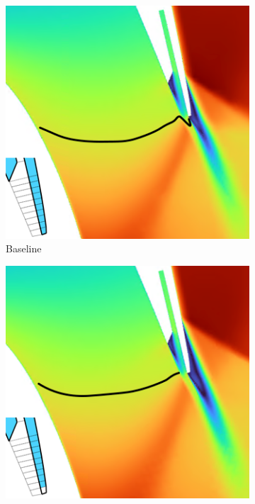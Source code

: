 \documentclass[a4paper, 11pt, oneside]{report}
\begin{document}
\begin{figure}[H]
	\centering
	\begin{subfigure}{.42\textwidth}
		\centering
		\includegraphics[width=\linewidth]{figs/ss_cutbacks_m1_lines_0.png}
		\caption{Baseline}
		\vspace{0.018\textheight}
	\end{subfigure}
	\hspace{0.05\textwidth}
	\begin{subfigure}{.42\textwidth}
		\centering
		\includegraphics[width=\linewidth]{figs/ss_cutbacks_m1_lines_1.png}

\end{subfigure}
\end{figure}
\end{document}
